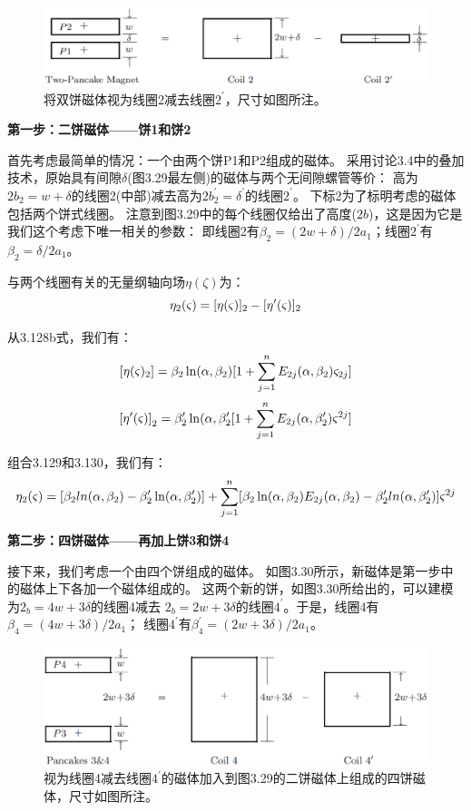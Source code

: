 \begin{figure}[htbp]
	\centering
	\includegraphics[scale=0.5]{chpt3/figs/fig3.29.eps}
	\caption{将双饼磁体视为线圈2减去线圈$2^\prime$，尺寸如图所注。}
\end{figure}

\textbf{第一步：二饼磁体——饼1和饼2}

首先考虑最简单的情况：一个由两个饼P1和P2组成的磁体。
采用讨论3.4中的叠加技术，原始具有间隙$\delta$(图3.29最左侧)的磁体与两个无间隙螺管等价：
高为$2b_2 = w +\delta$的线圈2(中部)减去高为$2b_2^\prime = \delta^\prime$的线圈$2^\prime$。
下标2为了标明考虑的磁体包括两个饼式线圈。
注意到图3.29中的每个线圈仅给出了高度($2b$)，这是因为它是我们这个考虑下唯一相关的参数：
即线圈2有$\beta_2=(2w+\delta)/2a_1$；线圈$2^\prime$有$\beta_2=\delta/2a_1$。

与两个线圈有关的无量纲轴向场$\eta(\zeta)$为：
\begin{equation}
\eta_{2}(\varsigma)=[\eta(\varsigma)]_{2}-[\eta'(\varsigma)]_{2}\\%
\end{equation}

从3.128b式，我们有：
$$
{[\eta(\varsigma)_{2}]}=\beta_{2}\ln(\alpha,\beta_{2})[1+\sum_{j=1}^{n}E_{2j}(\alpha,\beta_{2})\varsigma_{2j}]\\%
$$
$$
{[\eta'(\varsigma)]}_{2}=\beta'_{2}\ln(\alpha,\beta'_{2}[1+\sum_{j=1}^{n}E_{2j}(\alpha,\beta'_{2})\varsigma^{2j}]\\%
$$

组合3.129和3.130，我们有：
$$
\eta_{2}(\varsigma)=[\beta_{2}ln(\alpha,\beta_{2})-\beta'_{2}\ln(\alpha,\beta'_{2})]\\
+\sum_{j=1}^{n}[\beta_{2}\ln(\alpha,\beta_{2})E_{2j}(\alpha,\beta_{2})-\beta'_{2}ln(\alpha,\beta'_{2})]\varsigma^{2j}%
$$

\textbf{第二步：四饼磁体——再加上饼3和饼4}

接下来，我们考虑一个由四个饼组成的磁体。
如图3.30所示，新磁体是第一步中的磁体上下各加一个磁体组成的。
这两个新的饼，如图3.30所给出的，可以建模为$2_b=4w+3\delta$的线圈4减去
$2_b=2w+3\delta$的线圈$4^\prime$。于是，线圈4有$\beta_4=(4w+3\delta)/2a_1$；
线圈$4^\prime$有$\beta_4^\prime=(2w+3\delta)/2a_1$。
\begin{figure}[htbp]
	\centering
	\includegraphics[scale=0.4]{chpt3/figs/fig3.30.eps}
	\caption{视为线圈4减去线圈$4^\prime$的磁体加入到图3.29的二饼磁体上组成的四饼磁体，尺寸如图所注。}
\end{figure}

